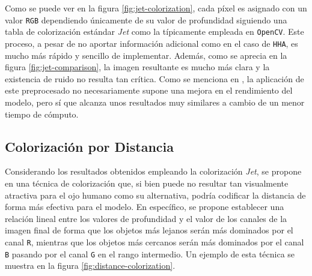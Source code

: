 \documentclass[12pt,a4paper]{report}
\begin{document}
Como se puede ver en la figura \ref{fig:jet-colorization}, cada píxel es asignado con un valor \texttt{RGB} dependiendo únicamente de su valor de profundidad siguiendo una tabla de colorización estándar \textit{Jet} como la típicamente empleada en \texttt{OpenCV}. Este proceso, a pesar de no aportar información adicional como en el caso de \texttt{HHA}, es mucho más rápido y sencillo de implementar. Además, como se aprecia en la figura \ref{fig:jet-comparison}, la imagen resultante es mucho más clara y la existencia de ruido no resulta tan crítica. Como se menciona en \cite{eitel2015multimodaldeeplearningrobust}, la aplicación de este preprocesado no necesariamente supone una mejora en el rendimiento del modelo, pero sí que alcanza unos resultados muy similares a cambio de un menor tiempo de cómputo.

\subsection{Colorización por Distancia}
\label{subsec:distance_colorization}
Considerando los resultados obtenidos empleando la colorización \textit{Jet}, se propone en una técnica de colorización que, si bien puede no resultar tan visualmente atractiva para el ojo humano como su alternativa, podría codificar la distancia de forma más efectiva para el modelo. En específico, se propone establecer una relación lineal entre los valores de profundidad y el valor de los canales de la imagen final de forma que los objetos más lejanos serán más dominados por el canal \texttt{R}, mientras que los objetos más cercanos serán más dominados por el canal \texttt{B} pasando por el canal \texttt{G} en el rango intermedio. Un ejemplo de esta técnica se muestra en la figura \ref{fig:distance-colorization}.
\end{document}
